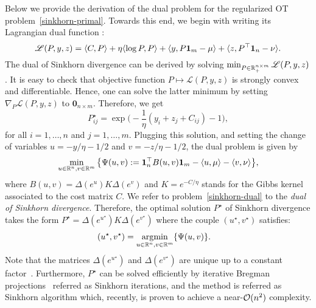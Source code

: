 Below we provide the derivation of the dual problem for the regularized OT problem~\eqref{sinkhorn-primal}. Towards this end, we begin with writing its Lagrangian dual function :
\begin{equation*}
  \mathscr{L}(P,y, z) = \langle C,P \rangle + \eta \langle \log P, P \rangle + \langle y, P\mathbf{1}_m - \mu \rangle + \langle z,P^\top \mathbf{1}_n - \nu \rangle.
\end{equation*}
The dual of Sinkhorn divergence can be derived by solving $\min_{P \in {\mathbb{R}}_+^{n\times m}}\mathscr{L}(P,y, z)$. It is easy to check that objective function $P\mapsto \mathscr{L}(P,y, z)$ is strongly convex and differentiable. Hence, one can solve the latter minimum by setting $\nabla_P \mathscr{L}(P,y, z)$ to $\mathbf{0}_{n\times m}$. Therefore, we get 
\begin{equation}
  P^\star_{ij} = \exp\Big(- \frac{1}{\eta} (y_i + z_j + C_{ij}) - 1\Big), 
\end{equation}
for all $i=1, \ldots, n$ and $j=1, \ldots, m$. Plugging this solution,  and setting the change of variables $u = -y/\eta - 1/2$ and $v = - z/\eta - 1/2$, the dual problem is given by
\begin{equation}
\label{sinkhorn-dual}
\min_{u \in {\mathbb{R}}^n, v\in{\mathbb{R}}^m}\big\{\Psi(u,v):= \mathbf{1}_n^\top B(u,v)\mathbf{1}_m - \langle u, \mu \rangle - \langle v, \nu \rangle \big\},
\end{equation}
where $B(u,v) = \Delta(e^{u}) K \Delta(e^{v})$ and $K = e^{-C/\eta}$ stands for the Gibbs kernel associated to the cost matrix $C$. 
We refer to problem~\eqref{sinkhorn-dual} to the \emph{dual of Sinkhorn divergence}.
Therefore, the optimal solution $P^\star$ of Sinkhorn divergence takes the form $P^\star = \Delta(e^{u^\star}) K \Delta(e^{v^\star})$
where the couple $(u^\star, v^\star)$ satisfies:
\begin{align*}
\label{sinkhorn-dual}
  (u^\star, v^\star) &= \operatorname*{\arg\!\min}_{u \in {\mathbb{R}}^{n}, v\in {\mathbb{R}}^m} \{\Psi(u,v)\}.
\end{align*}
Note that the matrices $\Delta(e^{u^\star})$ and $\Delta(e^{v^\star})$ are unique up to a constant factor~\citep{sinkhorn1967}. Furthermore, $P^\star$ can be solved efficiently by iterative Bregman projections~\cite{benamou2015IterativeBP} referred as Sinkhorn iterations, and the method is referred as Sinkhorn algorithm which, recently, is proven to achieve a near-$\mathcal{O}(n^2)$ complexity.

